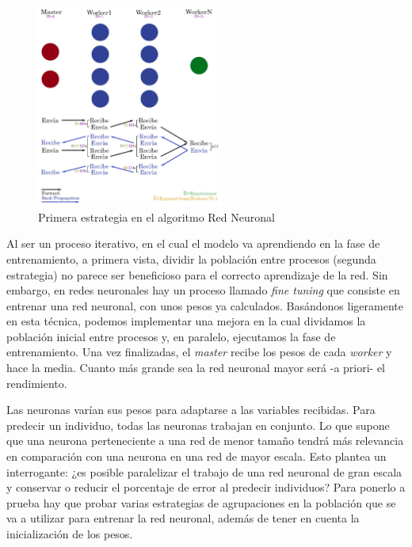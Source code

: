 	\begin{figure}[!h]
		\centering
		\includegraphics[width=0.55\textwidth]{images/chapter_3/redneu_mpi2}
		\caption{Primera estrategia en el algoritmo Red Neuronal}
		\label{fig:redneumpipipe}
	\end{figure}
	
	Al ser un proceso iterativo, en el cual el modelo va aprendiendo en la fase de entrenamiento, a primera vista, dividir la población entre procesos (segunda estrategia) no parece ser beneficioso para el correcto aprendizaje de la red. Sin embargo, en redes neuronales hay un proceso llamado \textit{fine tuning} \cite{malladi2023fine} que consiste en entrenar una red neuronal, con unos pesos ya calculados. Basándonos ligeramente en esta técnica, podemos implementar una mejora en la cual dividamos la población inicial entre procesos y, en paralelo, ejecutamos la fase de entrenamiento. Una vez finalizadas, el \textit{master} recibe los pesos de cada \textit{worker} y hace la media. Cuanto más grande sea la red neuronal mayor será -a priori- el rendimiento.
		
	Las neuronas varían sus pesos para adaptarse a las variables recibidas. Para predecir un individuo, todas las neuronas trabajan en conjunto. Lo que supone que una neurona perteneciente a una red de menor tamaño tendrá más relevancia en comparación con una neurona en una red de mayor escala. Esto plantea un interrogante: ¿es posible paralelizar el trabajo de una red neuronal de gran escala y conservar o reducir el porcentaje de error al predecir individuos? Para ponerlo a prueba hay que probar varias estrategias de agrupaciones en la población que se va a utilizar para entrenar la red neuronal, además de tener en cuenta la inicialización de los pesos.
	
